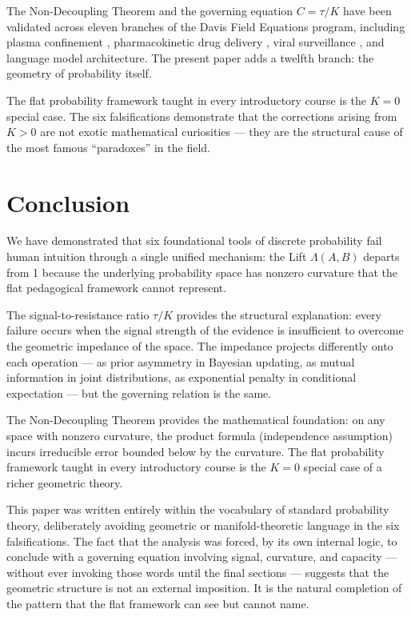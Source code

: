 \documentclass[12pt]{article}
\begin{document}
The Non-Decoupling Theorem and the governing equation $C = \tau/K$ have been validated across eleven branches of the Davis Field Equations program, including plasma confinement \cite{davis2026plasma}, pharmacokinetic drug delivery \cite{davis2026delivery}, viral surveillance \cite{davis2025field}, and language model architecture. The present paper adds a twelfth branch: the geometry of probability itself.

The flat probability framework taught in every introductory course is the $K = 0$ special case. The six falsifications demonstrate that the corrections arising from $K > 0$ are not exotic mathematical curiosities --- they are the structural cause of the most famous ``paradoxes'' in the field.

\section{Conclusion}

We have demonstrated that six foundational tools of discrete probability fail human intuition through a single unified mechanism: the Lift $\Lambda(A,B)$ departs from 1 because the underlying probability space has nonzero curvature that the flat pedagogical framework cannot represent.

The signal-to-resistance ratio $\tau/K$ provides the structural explanation: every failure occurs when the signal strength of the evidence is insufficient to overcome the geometric impedance of the space. The impedance projects differently onto each operation --- as prior asymmetry in Bayesian updating, as mutual information in joint distributions, as exponential penalty in conditional expectation --- but the governing relation is the same.

The Non-Decoupling Theorem provides the mathematical foundation: on any space with nonzero curvature, the product formula (independence assumption) incurs irreducible error bounded below by the curvature. The flat probability framework taught in every introductory course is the $K = 0$ special case of a richer geometric theory.

This paper was written entirely within the vocabulary of standard probability theory, deliberately avoiding geometric or manifold-theoretic language in the six falsifications. The fact that the analysis was forced, by its own internal logic, to conclude with a governing equation involving signal, curvature, and capacity --- without ever invoking those words until the final sections --- suggests that the geometric structure is not an external imposition. It is the natural completion of the pattern that the flat framework can see but cannot name.
\end{document}
